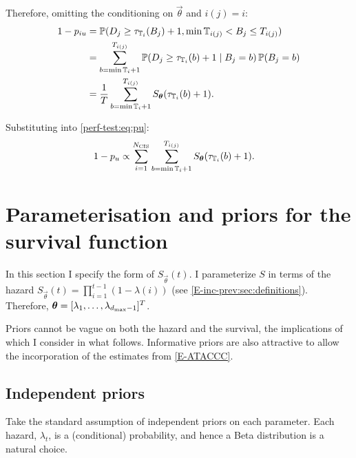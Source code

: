 \documentclass[thesis.tex]{subfiles}
\begin{document}
Therefore, omitting the conditioning on $\vec{\theta}$ and $i(j) = i$:
\begin{align}
1 - p_{iu}
&= \operatorname{\mathbb{P}}(D_j \geq \tau_{\mathbb{T}_{i}}(B_j)+ 1, \min \mathbb{T}_{i(j)} < B_j \leq T_{i(j)}) \\
&= \sum_{b = \min \mathbb{T}_{i} + 1}^{T_{i(j)}} \operatorname{\mathbb{P}}(D_j \geq \tau_{\mathbb{T}_{i}}(b) + 1 \mid B_j = b) \operatorname{\mathbb{P}}(B_j = b)\\
&= \frac{1}{T} \sum_{b = \min \mathbb{T}_{i} + 1}^{T_{i(j)}} S_{\bm{\theta}}(\tau_{\mathbb{T}_{i}}(b) + 1).
\label{perf-test:eq:piu}
\end{align}

Substituting into \cref{perf-test:eq:pu}:
\begin{align}
1 - p_u
& \propto \sum_{i=1}^{N_\text{CIS}} \sum_{b = \min \mathbb{T}_{i} + 1}^{T_{i(j)}} S_{\bm{\theta}}(\tau_{\mathbb{T}_{i}}(b) + 1).
\end{align}

\section{Parameterisation and priors for the survival function} \label{perf-test:sec:parameters-priors}

In this section I specify the form of $S_{\vec{\theta}}(t)$.
I parameterize $S$ in terms of the hazard $S_{\vec{\theta}}(t) = \prod_{i=1}^{t-1} (1 - \lambda(i))$ (see \cref{E-inc-prev:sec:definitions}).
Therefore, $\bm{\theta} = [\lambda_1, \dots, \lambda_{d_\text{max}-1}]^T$.

Priors cannot be vague on both the hazard and the survival, the implications of which I consider in what follows.
Informative priors are also attractive to allow the incorporation of the estimates from \cref{E-ATACCC}.

\subsection{Independent priors} \label{perf-test:sec:independent-priors}
Take the standard assumption of independent priors on each parameter.
Each hazard, $\lambda_t$, is a (conditional) probability, and hence a Beta distribution is a natural choice.
\end{document}
